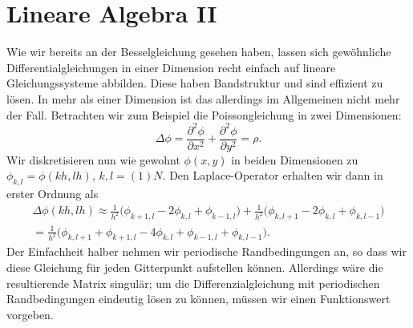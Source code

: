 % 

\chapter{Lineare Algebra \textrm{II}}
\label{chap:la}

Wie wir bereits an der Besselgleichung gesehen haben, lassen sich
gewöhnliche Differentialgleichungen in einer Dimension recht einfach
auf lineare Gleichungssysteme abbilden. Diese haben Bandstruktur und
sind effizient zu lösen.  In mehr als einer Dimension ist das
allerdings im Allgemeinen nicht mehr der Fall. Betrachten wir zum
Beispiel die Poissongleichung in zwei Dimensionen:
\begin{equation}
  \label{eq:laplace}
  \Delta \phi = \frac{\partial^2 \phi}{\partial x^2} +
  \frac{\partial^2 \phi}{\partial y^2} = \rho.
\end{equation}
Wir diskretisieren nun wie gewohnt $\phi(x,y)$ in beiden Dimensionen
zu $\phi_{k, l} = \phi(k h, l h)$, $k,l=(1)N$. Den Laplace-Operator
erhalten wir dann in erster Ordnung als
\begin{align}
  \label{eq:laplacedisc}
  \Delta \phi(k h, l h) \approx
  \frac{1}{h^2}\bigl(\phi_{k+1,l} -
  2\phi_{k,l}  + \phi_{k-1,l}\bigr) + 
  \frac{1}{h^2}\bigl(\phi_{k,l+1} -
  2\phi_{k,l}  + \phi_{k,l-1}\bigr)\nonumber\\
  = \frac{1}{h^2}\bigl(
  \phi_{k,l+1} + \phi_{k+1,l} - 4\phi_{k,l} +
  \phi_{k-1,l} + \phi_{k,l-1}\bigr).
\end{align}
Der Einfachheit halber nehmen wir periodische Randbedingungen an, so
dass wir diese Gleichung für jeden Gitterpunkt aufstellen
können. Allerdings wäre die resultierende Matrix singulär; um die
Differenzialgleichung mit periodischen Randbedingungen eindeutig lösen
zu können, müssen wir einen Funktionswert vorgeben.

